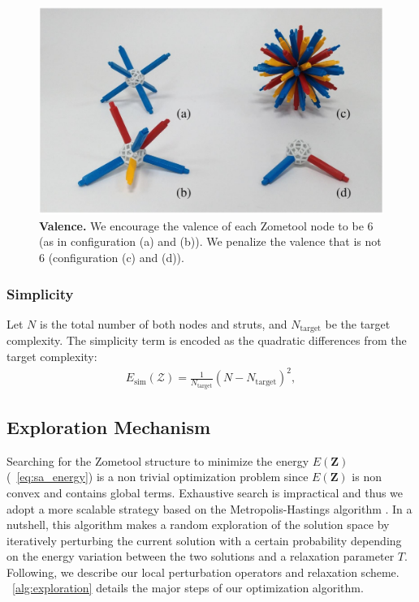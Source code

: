 \begin{figure}[ht]
\centering
\includegraphics[width=1.0\linewidth]{figs/Valence.pdf} 
\caption{\textbf{Valence.} We encourage the valence of each Zometool node to be 6 (as in configuration (a) and (b)). 
We penalize the valence that is not 6 (configuration (c) and (d)).
}
\label{fig:Valence}
\end{figure}

\subsubsection{Simplicity}
Let $N$ is the total number of both nodes and struts, and $N_\text{target}$ be the target complexity.
The simplicity term is encoded as the quadratic differences from the target complexity:
\begin{align}
E_{\text{sim}}(\mathcal{Z}) = \frac{1}{N_{\text{target}}}(N-N_{\text{target}})^2,
\end{align}

\subsection{Exploration Mechanism}
Searching for the Zometool structure to minimize the energy $E(\mathbf{Z})$ (\eqname~\ref{eq:sa_energy}) is a non trivial optimization problem since $E(\mathbf{Z})$ is non convex and contains global terms. 
Exhaustive search is impractical and thus we adopt a more scalable strategy based on the Metropolis-Hastings algorithm \cite{hastings:1970:monte}.
In a nutshell, this algorithm makes a random exploration of the solution space by iteratively perturbing the current solution with a certain probability depending on the energy variation between the two solutions and a relaxation parameter $T$.
Following, we describe our local perturbation operators and relaxation scheme.
\algoname~\ref{alg:exploration} details the major steps of our optimization algorithm.

